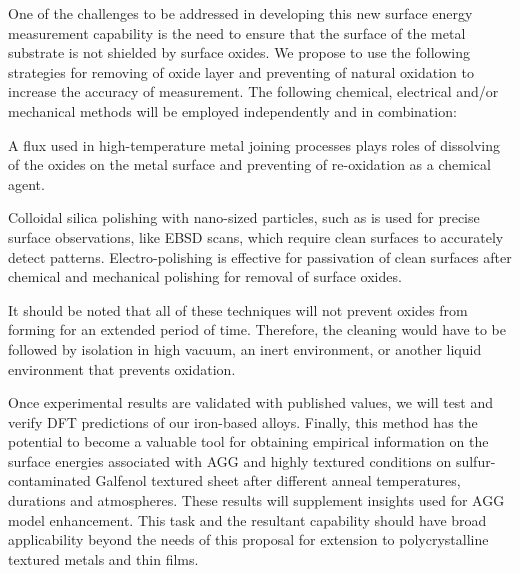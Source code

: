 One of the challenges to be addressed in developing this new surface energy measurement capability is the need to ensure that the surface of the metal substrate is not shielded by surface oxides. We propose to use the following strategies for removing of oxide layer and preventing of natural oxidation to increase the accuracy of measurement. The following chemical, electrical and/or mechanical methods will be employed independently and in combination:
\begin{outline}
	\1 A flux used in high-temperature metal joining processes plays roles of dissolving of the oxides on the metal surface and preventing of re-oxidation as a chemical agent.
		
	\1 Colloidal silica polishing with nano-sized particles, such as is used for precise surface observations, like EBSD scans, which require clean surfaces to accurately detect patterns.
	\1 Electro-polishing is effective for passivation of clean surfaces after chemical and mechanical polishing for removal of surface oxides. 
\end{outline}
It should be noted that all of these techniques will not prevent oxides from forming for an extended period of time. Therefore, the cleaning would have to be followed by isolation in high vacuum, an inert environment, or another liquid environment that prevents oxidation.

Once experimental results are validated with published values, we will test and verify DFT predictions of our iron-based alloys. Finally, this method has the potential to become a valuable tool for obtaining empirical information on the surface energies associated with AGG and highly textured conditions on sulfur-contaminated Galfenol textured sheet after different anneal temperatures, durations and atmospheres. These results will supplement insights used for AGG model enhancement. This task and the resultant capability should have broad applicability beyond the needs of this proposal for extension to polycrystalline textured metals and thin films.




